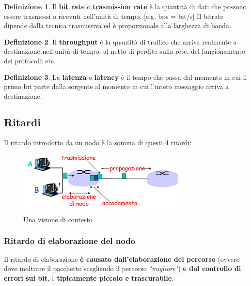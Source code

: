 \documentclass[11pt,a4paper]{article}
\theoremstyle{definition}
\newtheorem{definition}{Definizione}[section]
\begin{document}
\theoremstyle{definition}
\begin{definition}
	Il \textbf{bit rate} o \textbf{trasmission rate} è la quantità di dati che possono essere trasmessi o ricevuti nell'unità di tempo. [e.g. bps = bit/s]\newline
	Il bitrate dipende dalla tecnica trasmissiva ed è proporzionale alla larghezza di banda.
\end{definition}

\theoremstyle{definition}
\begin{definition}
	Il \textbf{throughput} è la quantità di traffico che arriva realmente a destinazione nell'unità di tempo, al netto di perdite sulla rete,
	del funzionamento dei protocolli etc.
\end{definition}

\theoremstyle{definition}
\begin{definition}
	La \textbf{latenza} o \textbf{latency} è il tempo che passa dal momento in cui il primo bit parte dalla sorgente al momento in cui l'intero messaggio arriva a destinazione. \newline
	\begin{center}
	\end{center}
\end{definition}
\newpage

\subsection{Ritardi}
Il ritardo introdotto da un nodo è la somma di questi 4 ritardi:
\begin{figure}[!h]
	\includegraphics[scale=0.7]{Immagini/Ritardi.png}
	\centering
	\caption{Una visione di contesto}
\end{figure}

\subsubsection{Ritardo di elaborazione del nodo}
Il ritardo di elaborazione \textbf{è causato dall'elaborazione del percorso} (ovvero dove inoltrare il pacchetto scegliendo il percorso \textit{"migliore"}) \textbf{e dal controllo di errori sui bit}, è \textbf{tipicamente piccolo e trascurabile}.
\end{document}
